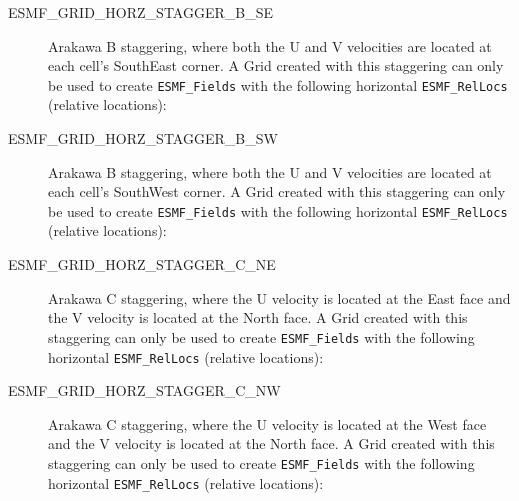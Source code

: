 \begin{description}
    \item [ESMF\_GRID\_HORZ\_STAGGER\_B\_SE]
          Arakawa B staggering, where both the U and V velocities are located at
          each cell's SouthEast corner.  A Grid created with this staggering can
          only be used to create {\tt ESMF\_Fields} with the following
          horizontal {\tt ESMF\_RelLocs} (relative locations):

    \item [ESMF\_GRID\_HORZ\_STAGGER\_B\_SW]
          Arakawa B staggering, where both the U and V velocities are located at
          each cell's SouthWest corner.  A Grid created with this staggering can
          only be used to create {\tt ESMF\_Fields} with the following
          horizontal {\tt ESMF\_RelLocs} (relative locations):

    \item [ESMF\_GRID\_HORZ\_STAGGER\_C\_NE]
          Arakawa C staggering, where the U velocity is located at the East face
          and the V velocity is located at the North face.  A Grid created with
          this staggering can only be used to create {\tt ESMF\_Fields} with the
          following horizontal {\tt ESMF\_RelLocs} (relative locations):

    \item [ESMF\_GRID\_HORZ\_STAGGER\_C\_NW]
          Arakawa C staggering, where the U velocity is located at the West face
          and the V velocity is located at the North face.  A Grid created with
          this staggering can only be used to create {\tt ESMF\_Fields} with the
          following horizontal {\tt ESMF\_RelLocs} (relative locations):
 

\end{description}
